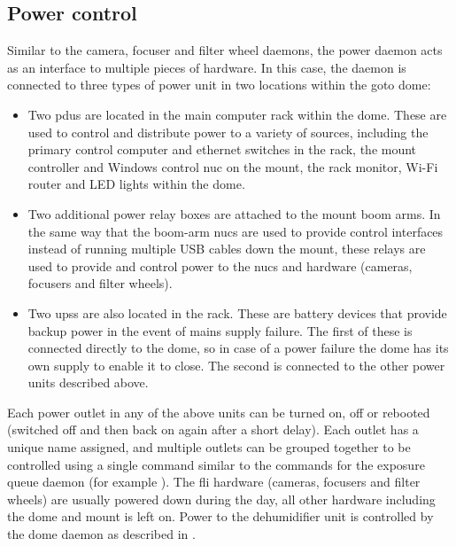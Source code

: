 \begin{colsection}
\begin{colsection}
\end{colsection}


\subsection{Power control}
\label{sec:power}
\begin{colsection}

Similar to the camera, focuser and filter wheel daemons, the power daemon acts as an interface to multiple pieces of hardware. In this case, the daemon is connected to three types of power unit in two locations within the \gls{goto} dome:

\begin{itemize}
    \item Two \glspl{pdu} are located in the main computer rack within the dome. These are used to control and distribute power to a variety of sources, including the primary control computer and ethernet switches in the rack, the mount controller and Windows control \gls{nuc} on the mount, the rack monitor, Wi-Fi router and LED lights within the dome.
    \item Two additional power relay boxes are attached to the mount boom arms. In the same way that the boom-arm \glspl{nuc} are used to provide control interfaces instead of running multiple USB cables down the mount, these relays are used to provide and control power to the \glspl{nuc} and hardware (cameras, focusers and filter wheels).
    \item Two \glspl{ups} are also located in the rack. These are battery devices that provide backup power in the event of mains supply failure. The first of these is connected directly to the dome, so in case of a power failure the dome has its own supply to enable it to close. The second is connected to the other power units described above.
\end{itemize}

Each power outlet in any of the above units can be turned on, off or rebooted (switched off and then back on again after a short delay). Each outlet has a unique name assigned, and multiple outlets can be grouped together to be controlled using a single command similar to the commands for the exposure queue daemon (for example ). The \gls{fli} hardware (cameras, focusers and filter wheels) are usually powered down during the day, all other hardware including the dome and mount is left on. Power to the dehumidifier unit is controlled by the dome daemon as described in .


\end{colsection}
\end{colsection}
